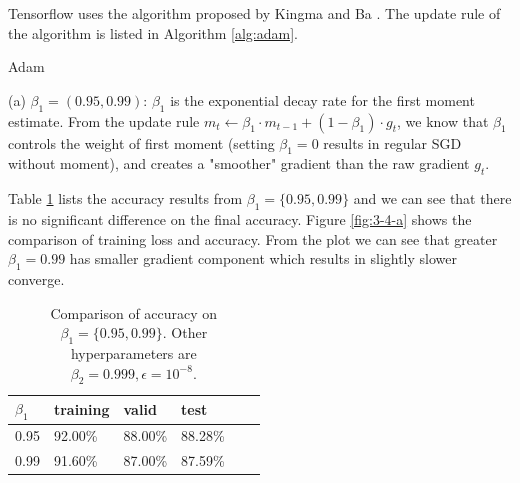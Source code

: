 \documentclass[12pt]{article}
\newenvironment{problem}[2][Problem]{\begin{trivlist}
\item[\hskip \labelsep {\bfseries #1}\hskip \labelsep {\bfseries #2.}]}{\end{trivlist}}
\begin{document}
\begin{problem}{3}
Tensorflow uses the algorithm proposed by Kingma and Ba \cite{adam}. The update rule of the algorithm is listed in Algorithm \ref{alg:adam}.

\begin{algorithm}
    \caption{Adam}
    \label{alg:adam}
    \begin{algorithmic}[1]
         
         
        \EndWhile
    \end{algorithmic}
\end{algorithm}

\bigskip

(a) $\beta_1 = (0.95, 0.99)$: $\beta_1$ is the exponential decay rate for the first moment estimate. From the update rule $m_t \gets \beta_1\cdot m_{t-1} + (1-\beta_1) \cdot g_t$,  we know that $\beta_1$ controls the weight of first moment (setting $\beta_1=0$ results in regular SGD without moment), and creates a "smoother" gradient than the raw gradient $g_t$.

Table \ref{table:3-4-a} lists the accuracy results from $\beta_1=\{0.95, 0.99\}$ and we can see that there is no significant difference on the final accuracy. Figure \ref{fig:3-4-a} shows the comparison of training loss and accuracy. From the plot we can see that greater $\beta_1=0.99$ has smaller gradient component which results in slightly slower converge.

\begin{table}[!htb]
\center
\begin{tabular}{|l|l|l|l|l|l|}
\hline
$\beta_1$ & training & valid   & test     \\ \hline
0.95      & 92.00\%  & 88.00\% & 88.28\%  \\ \hline
0.99      & 91.60\%  & 87.00\% & 87.59\%  \\ \hline
\end{tabular}
\caption{Comparison of accuracy on $\beta_1=\{0.95, 0.99\}$. Other hyperparameters are $\beta_2=0.999, \epsilon=10^{-8}$.}
\label{table:3-4-a}
\end{table}


\end{problem}
\end{document}
